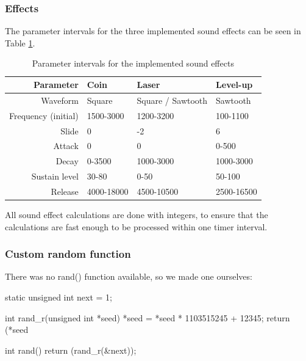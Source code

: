\subsubsection{Effects}

The parameter intervals for the three implemented sound effects can be seen in Table \ref{tab:sound_effects}.

\begin{table}[ht!]
    \begin{center}
    \begin{tabular}{r|lll}
    Parameter           & Coin       & Laser             & Level-up   \\
    \hline
    Waveform            & Square     & Square / Sawtooth & Sawtooth   \\
    Frequency (initial) & 1500-3000  & 1200-3200         & 100-1100   \\
    Slide               & 0          & -2                & 6          \\
    Attack              & 0          & 0                 & 0-500      \\
    Decay               & 0-3500     & 1000-3000         & 1000-3000  \\
    Sustain level       & 30-80      & 0-50              & 50-100     \\
    Release             & 4000-18000 & 4500-10500        & 2500-16500 \\
    \end{tabular}
    \end{center}
    \caption{Parameter intervals for the implemented sound effects}
    \label{tab:sound_effects}
\end{table}

All sound effect calculations are done with integers, to ensure that the calculations are fast enough to be processed within one timer interval.

\newpage

\subsubsection{Custom random function}

There was no rand() function available, so we made one ourselves:
\\[0.5cm]
\begin{code}

static unsigned int next = 1;

int rand_r(unsigned int *seed) {
    *seed = *seed * 1103515245 + 12345;
    return (*seed %
}

int rand() {
    return (rand_r(&next));
}


\end{code}